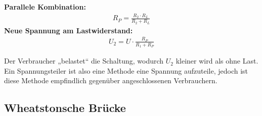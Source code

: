 \documentclass{article}
\begin{document}
\noindent \textbf{Parallele Kombination:}
\begin{align}
    R_P = \frac{R_2 \cdot R_L}{R_2 + R_L}
\end{align}
\textbf{Neue Spannung am Lastwiderstand:}
\begin{align}
    U_2 = U \cdot \frac{R_P}{R_1 + R_P}
\end{align}

\vspace{2em}
\noindent Der Verbraucher „belastet“ die Schaltung, wodurch $U_2$ kleiner wird als ohne Last.\\
Ein Spannungsteiler ist also eine Methode eine Spannung aufzuteile, jedoch ist diese Methode empfindlich gegenüber angeschlossenen Verbrauchern.

\subsection{Wheatstonsche Brücke}
\end{document}
